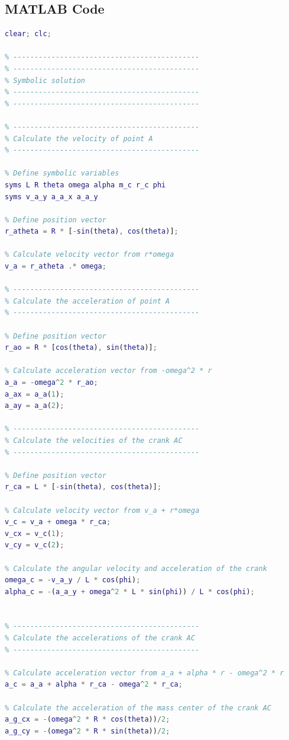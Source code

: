 \documentclass[12pt, titlepage]{article}
\begin{document}
\subsection{MATLAB Code}
\begin{lstlisting}[language=Matlab, style=mystyle]
% Omar Ebrahim 110076575
clear; clc;

% --------------------------------------------
% --------------------------------------------
% Symbolic solution
% --------------------------------------------
% --------------------------------------------

% --------------------------------------------
% Calculate the velocity of point A
% --------------------------------------------

% Define symbolic variables
syms L R theta omega alpha m_c r_c phi
syms v_a_y a_a_x a_a_y

% Define position vector
r_atheta = R * [-sin(theta), cos(theta)];

% Calculate velocity vector from r*omega
v_a = r_atheta .* omega;

% --------------------------------------------
% Calculate the acceleration of point A
% --------------------------------------------

% Define position vector
r_ao = R * [cos(theta), sin(theta)];

% Calculate acceleration vector from -omega^2 * r
a_a = -omega^2 * r_ao;
a_ax = a_a(1);
a_ay = a_a(2);

% --------------------------------------------
% Calculate the velocities of the crank AC
% --------------------------------------------

% Define position vector
r_ca = L * [-sin(theta), cos(theta)];

% Calculate velocity vector from v_a + r*omega
v_c = v_a + omega * r_ca;
v_cx = v_c(1);
v_cy = v_c(2);

% Calculate the angular velocity and acceleration of the crank
omega_c = -v_a_y / L * cos(phi);
alpha_c = -(a_a_y + omega^2 * L * sin(phi)) / L * cos(phi);


% --------------------------------------------
% Calculate the accelerations of the crank AC
% --------------------------------------------

% Calculate acceleration vector from a_a + alpha * r - omega^2 * r
a_c = a_a + alpha * r_ca - omega^2 * r_ca;

% Calculate the acceleration of the mass center of the crank AC
a_g_cx = -(omega^2 * R * cos(theta))/2;
a_g_cy = -(omega^2 * R * sin(theta))/2;


\end{lstlisting}
\end{document}
